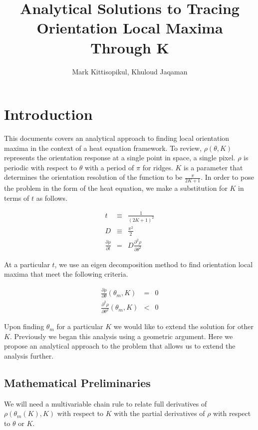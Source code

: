 \documentclass[11pt]{article} %
\title{Analytical Solutions to Tracing Orientation Local Maxima Through K}
\author{Mark Kittisopikul, Khuloud Jaqaman}
\begin{document}
\maketitle

\section{Introduction}

This documents covers an analytical approach to finding local orientation maxima in the context of a heat equation framework. To review, $ \rho(\theta,K) $ represents the orientation response at a single point in space, a single pixel. $ \rho $ is periodic with respect to $ \theta $ with a period of $ \pi $ for ridges. $ K $ is a parameter that determines the orientation resolution of the function to be $ \frac{\pi}{2K+1} $. In order to pose the problem in the form of the heat equation, we make a substitution for $ K $ in terms of  $ t $ as follows.

\begin{eqnarray}
t & \equiv & \frac{1}{(2K+1)^2} \\
D & \equiv & \frac{\pi^2}{2} \\
\frac{\partial \rho}{\partial t} & = & D \frac{\partial^2 \rho}{\partial \theta^2}
\end{eqnarray}

At a particular $ t $, we use an eigen decomposition method to find orientation local maxima that meet the following criteria.

\begin{eqnarray}
\frac{\partial \rho}{\partial \theta}(\theta_m,K) & = & 0 \\
\frac{\partial^2 \rho}{\partial \theta^2}(\theta_m,K) & < & 0
\end{eqnarray}

Upon finding $ \theta_m $ for a particular $ K $ we would like to extend the solution for other $ K $. Previously we began this analysis using a geometric argument. Here we propose an analytical approach to the problem that allows us to extend the analysis further.

\subsection{Mathematical Preliminaries}


We will need a multivariable chain rule to relate full derivatives of $ \rho(\theta_m(K),K) $ with respect to $ K $ with the partial derivatives of $ \rho $ with respect to $ \theta $ or $ K $.
\end{document}
